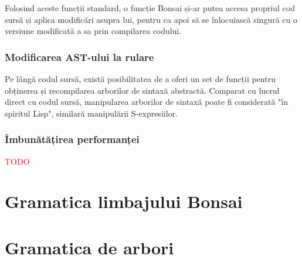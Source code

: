\documentclass[12pt,a4paper]{memoir}
\newcommand{\draft}{\textcolor{red}}
\begin{document}
Folosind aceste funcții standard, o funcție Bonsai și-ar putea accesa propriul cod sursă și aplica modificări asupra lui, pentru ca apoi să se înlocuiască singură cu o versiune modificată a sa prin compilarea codului.

\subsection{Modificarea AST-ului la rulare}

Pe lângă codul sursă, există posibilitatea de a oferi un set de funcții pentru obținerea și recompilarea arborilor de sintaxă abstractă. Comparat cu lucrul direct cu codul sursă, manipularea arborilor de sintaxă poate fi considerată "în spiritul Lisp", similară manipulării S-expresiilor.


\subsection{Îmbunătățirea performanței}

\draft{TODO}


\begin{appendices}


\chapter{Gramatica limbajului Bonsai}
\label{app:grammar}

\chapter{Gramatica de arbori}
\label{app:tree_grammar}

\end{appendices}


{}
\end{document}

